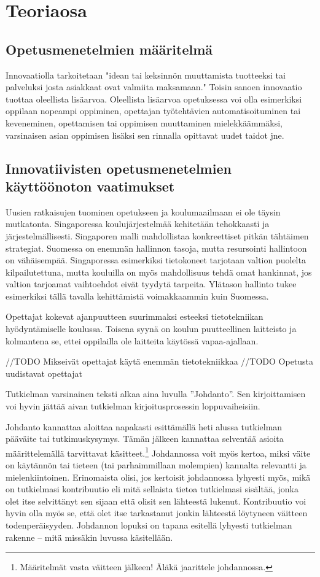 \documentclass[utf8,bachelor]{gradu3}
\begin{document}
\chapter{Teoriaosa}
\section{Opetusmenetelmien määritelmä}
Innovaatiolla tarkoitetaan "idean tai keksinnön muuttamista tuotteeksi tai palveluksi josta asiakkaat ovat valmiita maksamaan." \parencite[][]{innovaatio} Toisin sanoen innovaatio tuottaa oleellista lisäarvoa. Oleellista lisäarvoa opetuksessa voi olla esimerkiksi oppilaan nopeampi oppiminen, opettajan työtehtävien automatisoituminen tai keveneminen, opettamisen tai oppimisen muuttaminen mielekkäämmäksi, varsinaisen asian oppimisen lisäksi sen rinnalla opittavat uudet taidot jne.


\section{Innovatiivisten opetusmenetelmien käyttöönoton vaatimukset}
Uusien ratkaisujen tuominen opetukseen ja koulumaailmaan ei ole täysin mutkatonta. Singaporessa koulujärjestelmää kehitetään tehokkaasti ja järjestelmällisesti. Singaporen malli mahdollistaa konkreettiset pitkän tähtäimen strategiat. Suomessa on enemmän hallinnon tasoja, mutta resursointi hallintoon on vähäisempää. Singaporessa esimerkiksi tietokoneet tarjotaan valtion puolelta kilpailutettuna, mutta kouluilla on myös mahdollisuus tehdä omat hankinnat, jos valtion tarjoamat vaihtoehdot eivät tyydytä tarpeita. Ylätason hallinto tukee esimerkiksi tällä tavalla kehittämistä voimakkaammin kuin Suomessa. \parencite[][]{koulunArki} 

Opettajat kokevat ajanpuutteen suurimmaksi esteeksi tietotekniikan hyödyntämiselle koulussa. Toisena syynä on koulun puutteellinen laitteisto ja kolmantena se, ettei oppilailla ole laitteita käytössä vapaa-ajallaan. \parencite[][]{sites}

//TODO Mikseivät opettajat käytä enemmän tietotekniikkaa
//TODO Opetusta uudistavat opettajat

Tutkielman varsinainen teksti alkaa aina luvulla ''Johdanto''.  Sen
kirjoittamisen voi hyvin jättää aivan tutkielman kirjoitusprosessin
loppuvaiheisiin.

Johdanto kannattaa aloittaa napakasti esittämällä heti alussa
tutkielman pääväite tai tutkimuskysymys.  Tämän jälkeen kannattaa
selventää asioita määrittelemällä tarvittavat
käsitteet.\footnote{Määritelmät vasta väitteen jälkeen! Äläkä
  jaarittele johdannossa.}  Johdannossa voit myös kertoa, miksi väite
on käytännön tai tieteen (tai parhaimmillaan molempien) kannalta
relevantti ja mielenkiintoinen.  Erinomaista olisi, jos kertoisit
johdannossa lyhyesti myös, mikä on tutkielmasi kontribuutio eli mitä
sellaista tietoa tutkielmasi sisältää, jonka olet itse selvittänyt sen
sijaan että olisit sen lähteestä lukenut.  Kontribuutio voi hyvin olla
myös se, että olet itse tarkastanut jonkin lähteestä löytyneen
väitteen todenperäisyyden.  Johdannon lopuksi on tapana esitellä
lyhyesti tutkielman rakenne -- mitä missäkin luvussa käsitellään.
\end{document}
